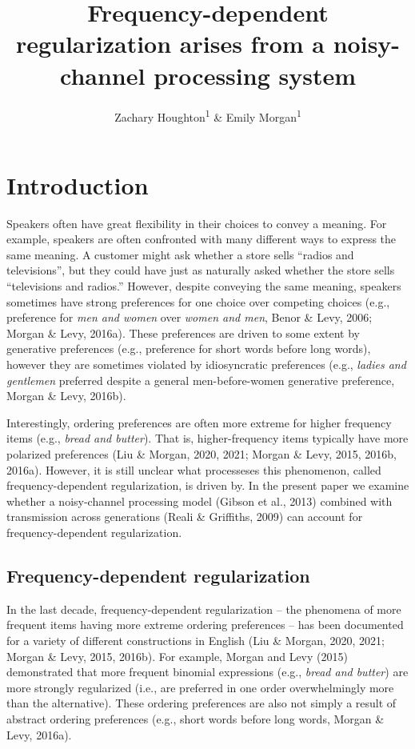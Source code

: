 \documentclass[
  jou,floatsintext]{apa6}
\title{Frequency-dependent regularization arises from a noisy-channel processing system}
\author{Zachary Houghton\textsuperscript{1} \& Emily Morgan\textsuperscript{1}}
\date{}
\affiliation{\vspace{0.5cm}\textsuperscript{1} University of California, Davis}
\begin{document}
\maketitle

\section{Introduction}\label{introduction}

Speakers often have great flexibility in their choices to convey a meaning. For example, speakers are often confronted with many different ways to express the same meaning. A customer might ask whether a store sells ``radios and televisions'', but they could have just as naturally asked whether the store sells ``televisions and radios.'' However, despite conveying the same meaning, speakers sometimes have strong preferences for one choice over competing choices (e.g., preference for \emph{men and women} over \emph{women and men}, Benor \& Levy, 2006; Morgan \& Levy, 2016a). These preferences are driven to some extent by generative preferences (e.g., preference for short words before long words), however they are sometimes violated by idiosyncratic preferences (e.g., \emph{ladies and gentlemen} preferred despite a general men-before-women generative preference, Morgan \& Levy, 2016b).

Interestingly, ordering preferences are often more extreme for higher frequency items (e.g., \emph{bread and butter}). That is, higher-frequency items typically have more polarized preferences (Liu \& Morgan, 2020, 2021; Morgan \& Levy, 2015, 2016b, 2016a). However, it is still unclear what processeses this phenomenon, called frequency-dependent regularization, is driven by. In the present paper we examine whether a noisy-channel processing model (Gibson et al., 2013) combined with transmission across generations (Reali \& Griffiths, 2009) can account for frequency-dependent regularization.

\subsection{Frequency-dependent regularization}\label{frequency-dependent-regularization}

In the last decade, frequency-dependent regularization -- the phenomena of more frequent items having more extreme ordering preferences -- has been documented for a variety of different constructions in English (Liu \& Morgan, 2020, 2021; Morgan \& Levy, 2015, 2016b). For example, Morgan and Levy (2015) demonstrated that more frequent binomial expressions (e.g., \emph{bread and butter}) are more strongly regularized (i.e., are preferred in one order overwhelmingly more than the alternative). These ordering preferences are also not simply a result of abstract ordering preferences (e.g., short words before long words, Morgan \& Levy, 2016a).
\end{document}
